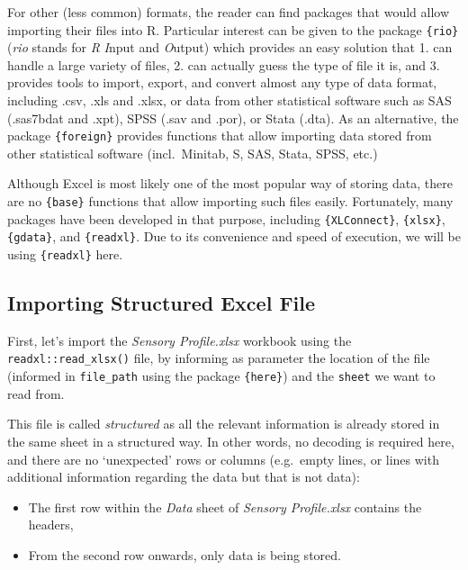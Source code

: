 \documentclass[
]{book}
\providecommand{\tightlist}{%
  \setlength{\itemsep}{0pt}\setlength{\parskip}{0pt}}
\begin{document}
For other (less common) formats, the reader can find packages that would allow importing their files into R. Particular interest can be given to the package \texttt{\{rio\}} (\emph{rio} stands for \emph{R} \emph{I}nput and \emph{O}utput) which provides an easy solution that 1. can handle a large variety of files, 2. can actually guess the type of file it is, and 3. provides tools to import, export, and convert almost any type of data format, including .csv, .xls and .xlsx, or data from other statistical software such as SAS (.sas7bdat and .xpt), SPSS (.sav and .por), or Stata (.dta). As an alternative, the package \texttt{\{foreign\}} provides functions that allow importing data stored from other statistical software (incl.~Minitab, S, SAS, Stata, SPSS, etc.)

Although Excel is most likely one of the most popular way of storing data, there are no \texttt{\{base\}} functions that allow importing such files easily. Fortunately, many packages have been developed in that purpose, including \texttt{\{XLConnect\}}, \texttt{\{xlsx\}}, \texttt{\{gdata\}}, and \texttt{\{readxl\}}. Due to its convenience and speed of execution, we will be using \texttt{\{readxl\}} here.

\hypertarget{importing-structured-excel-file}{%
\subsection{Importing Structured Excel File}\label{importing-structured-excel-file}}

First, let's import the \emph{Sensory Profile.xlsx} workbook using the \texttt{readxl::read\_xlsx()} file, by informing as parameter the location of the file (informed in \texttt{file\_path} using the package \texttt{\{here\}}) and the \texttt{sheet} we want to read from.

This file is called \emph{structured} as all the relevant information is already stored in the same sheet in a structured way. In other words, no decoding is required here, and there are no `unexpected' rows or columns (e.g.~empty lines, or lines with additional information regarding the data but that is not data):

\begin{itemize}
\tightlist
\item
  The first row within the \emph{Data} sheet of \emph{Sensory Profile.xlsx} contains the headers,\\
\item
  From the second row onwards, only data is being stored.
\end{itemize}
\end{document}
